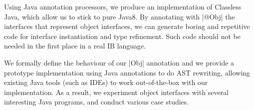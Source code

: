 
Using Java annotation processors, we produce an implementation of
Classless Java, which allow us to stick to pure Java8. By annotating
with \Q|@Obj| the interfaces that represent object interfaces, we can
generate boring and repetitive code for interface instantiation and
type refinement.  Such code should not be needed in the first place in
a real IB language.



%

We formally define the behaviour of our \Q|Obj| annotation and we provide a
prototype implementation using Java annotations to do AST
rewriting, allowing existing Java tools (such as IDEs) to work
out-of-the-box with our implementation. As a result, we
experiment object interfaces with several interesting Java programs,
and conduct various case studies.


